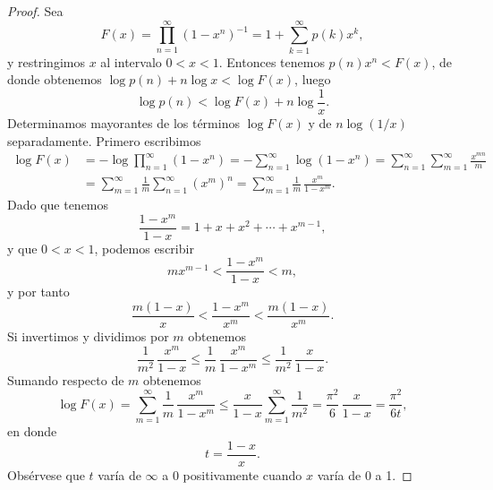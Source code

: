 \documentclass[12pt,a4paper]{book}
\begin{document}
    \begin{proof}
        Sea
        \begin{equation*}
            F(x)=\prod_{n=1}^{\infty}(1-x^{n})^{-1}=1+\sum_{k=1}^{\infty}p(k)x^{k},
        \end{equation*}
        y restringimos $x$ al intervalo $0<x<1$. Entonces tenemos $p(n)x^{n}<F(x)$, de donde
        obtenemos $\log p(n)+n\log x<\log F(x)$, luego
        \begin{equation}\label{eq:14-9}
            \log p(n)<\log F(x)+n\log\frac{1}{x}.
        \end{equation}
        Determinamos mayorantes de los términos $\log F(x)$ y de $n\log(1/x)$ separadamente.
        Primero escribimos
        \begin{align*}
            \log F(x)&=-\log\prod_{n=1}^{\infty}(1-x^{n})=-\sum_{n=1}^{\infty}\log(1-x^{n})=\sum_{n=1}^{\infty}\sum_{m=1}^{\infty}\frac{x^{mn}}{m}\\
            &=\sum_{m=1}^{\infty}\frac{1}{m}\sum_{n=1}^{\infty}(x^{m})^{n}=\sum_{m=1}^{\infty}\frac{1}{m}\,\frac{x^{m}}{1-x^{m}}.
        \end{align*}
        Dado que tenemos
        \begin{equation*}
            \frac{1-x^{m}}{1-x}=1+x+x^{2}+\cdots+x^{m-1},
        \end{equation*}
        y que $0<x<1$, podemos escribir
        \begin{equation*}
            mx^{m-1}<\frac{1-x^{m}}{1-x}<m,
        \end{equation*}
        y por tanto
        \begin{equation*}
            \frac{m(1-x)}{x}<\frac{1-x^{m}}{x^{m}}<\frac{m(1-x)}{x^{m}}.
        \end{equation*}
        Si invertimos y dividimos por $m$ obtenemos
        \begin{equation*}
            \frac{1}{m^{2}}\,\frac{x^{m}}{1-x}\leq\frac{1}{m}\,\frac{x^{m}}{1-x^{m}}\leq\frac{1}{m^{2}}\,\frac{x}{1-x}.
        \end{equation*}
        Sumando respecto de $m$ obtenemos
        \begin{equation*}
            \log F(x)=\sum_{m=1}^{\infty}\frac{1}{m}\,\frac{x^{m}}{1-x^{m}}\leq\frac{x}{1-x}\sum_{m=1}^{\infty}\frac{1}{m^{2}}=\frac{\pi^{2}}{6}\,\frac{x}{1-x}=\frac{\pi^{2}}{6t},
        \end{equation*}
        en donde
        \begin{equation*}
            t=\frac{1-x}{x}.
        \end{equation*}
        Obsérvese que $t$ varía de $\infty$ a 0 positivamente cuando $x$ varía de 0 a 1.


\end{proof}
\end{document}
